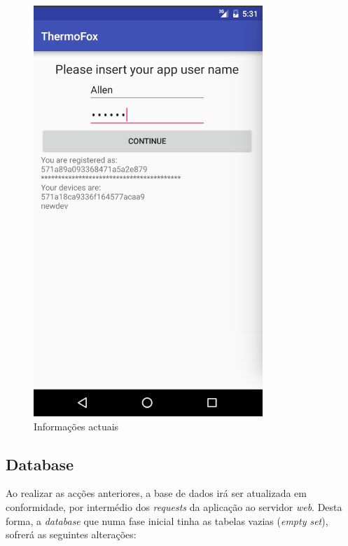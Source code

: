 \documentclass[a4paper]{article}
\begin{document}
\begin{figure}[H]
  \includegraphics[width=0.95\linewidth]{show.png}
  \caption{Informações actuais}\label{fig:15}
\endminipage\hfill
\end{figure}


\subsection{Database}

Ao realizar as acções anteriores, a base de dados irá ser atualizada em conformidade, por intermédio dos \textit{requests} da aplicação ao servidor \textit{web}. Desta forma, a \textit{database} que numa fase inicial tinha as tabelas vazias (\textit{empty set}), sofrerá as seguintes alterações:
\end{document}
